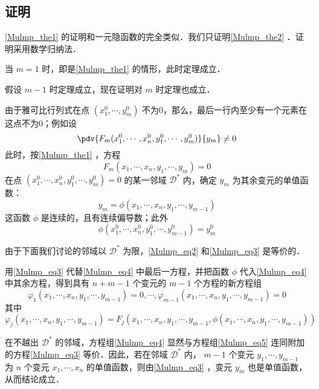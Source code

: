 \subsection{证明}
\autoref{Mulmp_the1} 的证明和一元隐函数的完全类似．我们只证明\autoref{Mulmp_the2} ．证明采用数学归纳法．

当 $m=1$ 时，即是\autoref{Mulmp_the1} 的情形，此时定理成立．

假设 $m-1$ 时定理成立，现在证明对 $m$ 时定理也成立．

由于雅可比行列式在点 $(x_1^0,\cdots,y_m^0)$ 不为0，那么，最后一行内至少有一个元素在这点不为0；例如设
\begin{equation}
\pdv{F_m(x_1^0,\cdots,x_n^0,y_1^0,\cdots,y_m^0)}{y_m}\neq0
\end{equation}
此时，按\autoref{Mulmp_the1} ，方程
\begin{equation}\label{Mulmp_eq2}
F_m(x_1,\cdots,x_n,y_1,\cdots,y_m)=0
\end{equation}
在点 $(x_1^0,\cdots,x_n^0,y_1^0,\cdots,y_m^0)=0$ 的某一邻域 $\mathcal{D}^*$ 内，确定 $y_m$ 为其余变元的单值函数：
\begin{equation}\label{Mulmp_eq3}
y_m=\phi(x_1,\cdots,x_n,y_1,\cdots,y_{m-1})
\end{equation}
这函数 $\phi$ 是连续的，且有连续偏导数；此外
\begin{equation}
\phi(x_1^0,\cdots,x_n^0,y_1^0,\cdots,y_{m-1}^0)=y_m^0
\end{equation}

由于下面我们讨论的邻域以 $\mathcal{D}^*$ 为限，\autoref{Mulmp_eq2} 和\autoref{Mulmp_eq3} 是等价的．

用\autoref{Mulmp_eq3} 代替\autoref{Mulmp_eq4} 中最后一方程，并把函数 $\phi$ 代入\autoref{Mulmp_eq4} 中其余方程，得到具有 $n+m-1$ 个变元的 $m-1$ 个方程的新方程组
\begin{equation}\label{Mulmp_eq5}
\varphi_1(x_1,\cdots,x_n,y_1,\cdots,y_{m-1})=0,\cdots,\varphi_{m-1}(x_1,\cdots,x_n,y_1,\cdots,y_{m-1})=0
\end{equation}
其中
\begin{equation}\label{Mulmp_eq6}\varphi_j(x_1,\cdots,x_n,y_1,\cdots,y_{m-1})=F_j(x_1,\cdots,x_n,y_1,\cdots,y_{m-1},\phi(x_1,\cdots,x_n,y_1,\cdots,y_{m-1}))
\end{equation}

在不越出 $\mathcal{D}^*$ 的邻域，方程组\autoref{Mulmp_eq4} 显然与方程组\autoref{Mulmp_eq5} 连同附加的方程\autoref{Mulmp_eq3} 等价．因此，若在邻域 $\mathcal{D}^*$ 内， $m-1$ 个变元 $y_1,\cdots,y_{m-1}$ 为 $n$ 个变元 $x_1,\cdots,x_n$ 的单值函数，则由\autoref{Mulmp_eq3} ，变元 $y_m$ 也是单值函数，从而结论成立．

